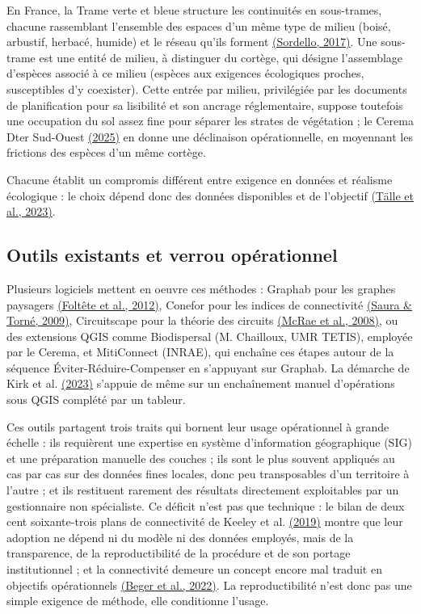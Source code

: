 \documentclass[a4paper,11pt]{report}
\begin{document}
En France, la Trame verte et bleue structure les continuités en sous-trames, chacune rassemblant l'ensemble des espaces d'un même type de milieu (boisé, arbustif, herbacé, humide) et le réseau qu'ils forment \hyperref[sec:bibliographie]{(Sordello, 2017)}. Une sous-trame est une entité de milieu, à distinguer du cortège, qui désigne l'assemblage d'espèces associé à ce milieu (espèces aux exigences écologiques proches, susceptibles d'y coexister). Cette entrée par milieu, privilégiée par les documents de planification pour sa lisibilité et son ancrage réglementaire, suppose toutefois une occupation du sol assez fine pour séparer les strates de végétation ; le Cerema Dter Sud-Ouest \hyperref[sec:bibliographie]{(2025)} en donne une déclinaison opérationnelle, en moyennant les frictions des espèces d'un même cortège.

Chacune établit un compromis différent entre exigence en données et réalisme écologique : le choix dépend donc des données disponibles et de l'objectif \hyperref[sec:bibliographie]{(Tälle et al., 2023)}.

\subsection{Outils existants et verrou opérationnel}\label{sec:1.5.4}

Plusieurs logiciels mettent en oeuvre ces méthodes : Graphab pour les graphes paysagers \hyperref[sec:bibliographie]{(Foltête et al., 2012)}, Conefor pour les indices de connectivité \hyperref[sec:bibliographie]{(Saura \& Torné, 2009)}, Circuitscape pour la théorie des circuits \hyperref[sec:bibliographie]{(McRae et al., 2008)}, ou des extensions QGIS comme Biodispersal (M. Chailloux, UMR TETIS), employée par le Cerema, et MitiConnect (INRAE), qui enchaîne ces étapes autour de la séquence Éviter-Réduire-Compenser en s'appuyant sur Graphab. La démarche de Kirk et al. \hyperref[sec:bibliographie]{(2023)} s'appuie de même sur un enchaînement manuel d'opérations sous QGIS complété par un tableur.

Ces outils partagent trois traits qui bornent leur usage opérationnel à grande échelle : ils requièrent une expertise en système d'information géographique (SIG) et une préparation manuelle des couches ; ils sont le plus souvent appliqués au cas par cas sur des données fines locales, donc peu transposables d'un territoire à l'autre ; et ils restituent rarement des résultats directement exploitables par un gestionnaire non spécialiste. Ce déficit n'est pas que technique : le bilan de deux cent soixante-trois plans de connectivité de Keeley et al. \hyperref[sec:bibliographie]{(2019)} montre que leur adoption ne dépend ni du modèle ni des données employés, mais de la transparence, de la reproductibilité de la procédure et de son portage institutionnel ; et la connectivité demeure un concept encore mal traduit en objectifs opérationnels \hyperref[sec:bibliographie]{(Beger et al., 2022)}. La reproductibilité n'est donc pas une simple exigence de méthode, elle conditionne l'usage.
\end{document}
